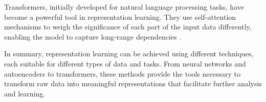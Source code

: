 Transformers, initially developed for natural language processing tasks, have become a powerful tool in representation learning. They use self-attention mechanisms to weigh the significance of each part of the input data differently, enabling the model to capture long-range dependencies .

In summary, representation learning can be achieved using different techniques, each suitable for different types of data and tasks. From neural networks and autoencoders to transformers, these methods provide the tools necessary to transform raw data into meaningful representations that facilitate further analysis and learning.

